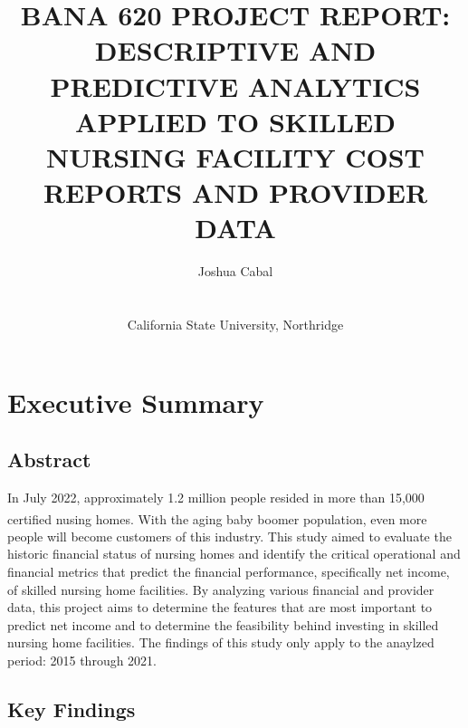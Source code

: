 \documentclass{article}
\title{\textbf{BANA 620 PROJECT REPORT: DESCRIPTIVE AND PREDICTIVE ANALYTICS APPLIED TO SKILLED NURSING FACILITY COST REPORTS AND PROVIDER DATA}}
\author{Joshua Cabal \\ \\ \\California State University, Northridge \\}
\theoremstyle{mytheoremstyle}
\theoremstyle{mytheoremstyle}
\theoremstyle{myproblemstyle}
\begin{document}
    \maketitle
    \pagebreak
    \tableofcontents    
    \newpage


\section{Executive Summary}

\subsection{Abstract}

In July 2022, approximately 1.2 million people resided in more than 15,000 certified nusing homes\textsuperscript{\cite{oig_nursing_homes}}. With the aging baby boomer population, even more people will become customers of this industry. This study aimed to evaluate the historic financial status of nursing homes and identify the critical operational and financial metrics that predict the financial performance, specifically net income, of skilled nursing home facilities. By analyzing various financial and provider data, this project aims to determine the features that are most important to predict net income and to determine the feasibility behind investing in skilled nursing home facilities. The findings of this study only apply to the anaylzed period: 2015 through 2021.

\subsection{Key Findings}
\end{document}
